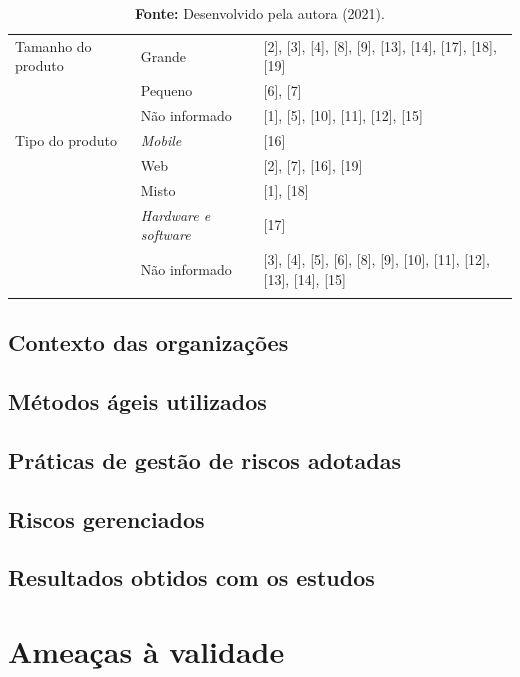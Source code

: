 \documentclass[
    12pt,       %
    openright,      %
    twoside,      %
    a4paper,      %
    english,      %
    french,       %
    spanish,      %
    brazil,       %
    ]{abntex2}
\begin{document}
\begin{longtable}{|p{4cm}|p{4cm}|p{8cm}|}
            \multirow{1}{10em}{Tamanho do produto}
            & Grande & [2], [3], [4], [8], [9], [13], [14], [17], [18], [19] \\ 
            & Pequeno & [6], [7] \\ 
            & Não informado & [1], [5], [10], [11], [12], [15]
            \\ \hline
            
            \multirow{1}{10em}{Tipo do produto}
            & \textit{Mobile} & [16]\\ 
            & Web & [2], [7], [16], [19] \\ 
            & Misto & [1], [18] \\
            & \textit{Hardware e software} & [17] \\
            & Não informado & [3], [4], [5], [6], [8], [9], [10], [11], [12], [13], [14], [15]
            \\ \hline
        
            \addlinespace[0.2cm]
            \caption*{\textbf{Fonte:} Desenvolvido pela autora (2021).}
\end{longtable}

\subsection{Contexto das organizações}

\subsection{Métodos ágeis utilizados}

\subsection{Práticas de gestão de riscos adotadas}

\subsection{Riscos gerenciados}

\subsection{Resultados obtidos com os estudos}

\section{Ameaças à validade}
\end{document}
